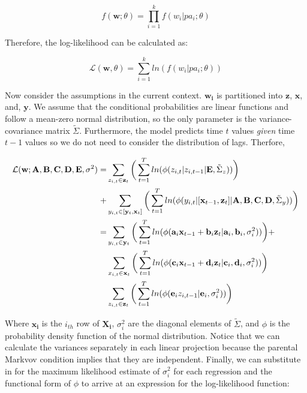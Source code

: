 \documentclass{article}
\begin{document}
\begin{equation}
  f(\mathbf{w};\theta) = \prod_{i=1}^{k} f(w_i | pa_i;\theta)
\end{equation}

Therefore, the log-likelihood can be calculated as:

\begin{equation}
  \mathcal{L}(\mathbf{w},\theta) = \sum_{i=1}^{k} ln(f(w_i | pa_i;\theta))
\end{equation}

Now consider the assumptions in the current context. $\mathbf{w_i}$ is partitioned into $\mathbf{z}$, $\mathbf{x}$, and, $\mathbf{y}$. We assume that the conditional probabilities are linear functions and follow a mean-zero normal distribution, so the only parameter is the variance-covariance matrix $\tilde{\Sigma}$. Furthermore, the model predicts time $t$ values \textit{given} time $t-1$ values so we do not need to consider the distribution of lags. Therfore,

\begin{align}
  \mathcal{L}(\mathbf{w}; \mathbf{A}, \mathbf{B}, \mathbf{C}, \mathbf{D}, \mathbf{E}, \mathbf{\sigma}^2) =& \sum_{z_{i,t} \in \mathbf{z}_t} \bigg{(} \sum_{t=1}^{T} ln(\phi(z_{i,t} | z_{i,t-1} | \mathbf{E}, \tilde{\Sigma}_z)) \bigg{)} \nonumber\\
  +& \sum_{y_{i,t} \in [\mathbf{y}_t,\mathbf{x}_t]} \bigg{(} \sum_{t=1}^{T} ln(\phi(y_{i,t} | [\mathbf{x}_{t-1}, \mathbf{z}_{t}] | \mathbf{A}, \mathbf{B}, \mathbf{C}, \mathbf{D}, \tilde{\Sigma}_y)) \bigg{)} \\
  =& \sum_{y_{i,t} \in \mathbf{y}_t} \bigg{(} \sum_{t=1}^{T} ln(\phi(\mathbf{a}_i \mathbf{x}_{t-1} + \mathbf{b}_i \mathbf{z}_t | \mathbf{a}_i, \mathbf{b}_i, \sigma_i^2)) \bigg{)} + \nonumber\\
  & \sum_{x_{i,t} \in \mathbf{x}_t} \bigg{(} \sum_{t=1}^{T} ln(\phi(\mathbf{c}_i \mathbf{x}_{t-1} + \mathbf{d}_i \mathbf{z}_t | \mathbf{c}_i, \mathbf{d}_i, \sigma_i^2)) \bigg{)} \nonumber\\
  & \sum_{z_{i,t} \in \mathbf{z}_t} \bigg{(} \sum_{t=1}^{T} ln(\phi(\mathbf{e}_i z_{i,t-1}  | \mathbf{e}_i, \sigma_i^2)) \bigg{)}
\end{align}

Where $\mathbf{x_i}$ is the $i_{th}$ row of $\mathbf{X_i}$, $\sigma_i^2$ are the diagonal elements of $\tilde{\Sigma}$, and $\phi$ is the probability density function of the normal distribution. Notice that we can calculate the variances separately in each linear projection because the parental Markvov condition implies that they are independent. Finally, we can substitute in for the maximum likelihood estimate of $\sigma_i^2$ for each regression and the functional form of $\phi$ to arrive at an expression for the log-likelihood function:
\end{document}
